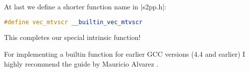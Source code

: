 At last we define a shorter function name in |s2pp.h|:
\begin{lstlisting}[language=C++,basicstyle=\ttfamily\scriptsize,keywordstyle=\color{red}] 
#define vec_mtvscr __builtin_vec_mtvscr
\end{lstlisting}
This completes our special intrinsic function!

For implementing a builtin function for earlier GCC versions (4.4 and earlier) I highly recommend the guide by Mauricio Alvarez \cite{altivecbuiltins}.
